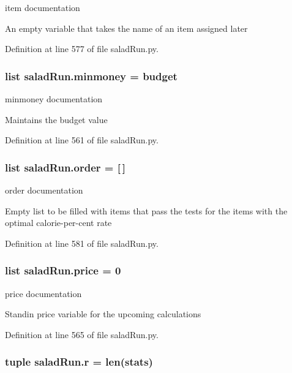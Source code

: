 item documentation 

An empty variable that takes the name of an item assigned later 

Definition at line 577 of file salad\-Run.\-py.

\hypertarget{namespacesaladRun_aec7a04d9763dd4a9edb2a8e7079b86da}{
\subsubsection[{minmoney}]{\setlength{\rightskip}{0pt plus 5cm}list salad\-Run.\-minmoney = {\bf budget}}}\label{namespacesaladRun_aec7a04d9763dd4a9edb2a8e7079b86da}


minmoney documentation 

Maintains the budget value 

Definition at line 561 of file salad\-Run.\-py.

\hypertarget{namespacesaladRun_af834081a188e9bfd5bdb43f6d551064f}{
\subsubsection[{order}]{\setlength{\rightskip}{0pt plus 5cm}list salad\-Run.\-order = \mbox{[}$\,$\mbox{]}}}\label{namespacesaladRun_af834081a188e9bfd5bdb43f6d551064f}


order documentation 

Empty list to be filled with items that pass the tests for the items with the optimal calorie-\/per-\/cent rate 

Definition at line 581 of file salad\-Run.\-py.

\hypertarget{namespacesaladRun_a1629ac12f6e81f15f118e33c0b65f6db}{
\subsubsection[{price}]{\setlength{\rightskip}{0pt plus 5cm}list salad\-Run.\-price = 0}}\label{namespacesaladRun_a1629ac12f6e81f15f118e33c0b65f6db}


price documentation 

Standin price variable for the upcoming calculations 

Definition at line 565 of file salad\-Run.\-py.

\hypertarget{namespacesaladRun_a3de78eeea44ec59c8cd88a594ea791fa}{
\subsubsection[{r}]{\setlength{\rightskip}{0pt plus 5cm}tuple salad\-Run.\-r = len({\bf stats})}}\label{namespacesaladRun_a3de78eeea44ec59c8cd88a594ea791fa}


